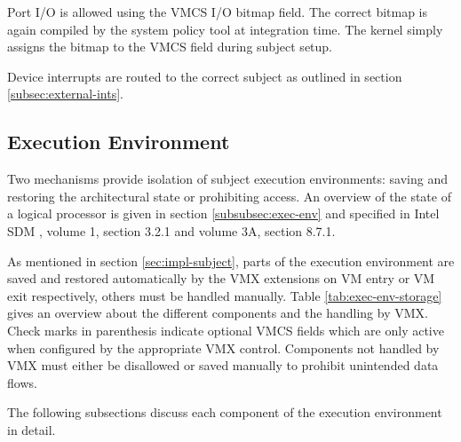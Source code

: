 Port I/O is allowed using the VMCS I/O bitmap field. The correct bitmap is again
compiled by the system policy tool at integration time. The kernel simply assigns
the bitmap to the VMCS field during subject setup.

Device interrupts are routed to the correct subject as outlined in section
\ref{subsec:external-ints}.

\subsection{Execution Environment}\label{subsec:exec-env-sep}
Two mechanisms provide isolation of subject execution environments: saving and
restoring the architectural state or prohibiting access. An overview of the
state of a logical processor is given in section \ref{subsubsec:exec-env} and
specified in Intel SDM \cite{IntelSDM}, volume 1, section 3.2.1 and volume 3A,
section 8.7.1.

As mentioned in section \ref{sec:impl-subject}, parts of the execution
environment are saved and restored automatically by the VMX extensions on VM
entry or VM exit respectively, others must be handled manually. Table
\ref{tab:exec-env-storage} gives an overview about the different components and
the handling by VMX. Check marks in parenthesis indicate optional VMCS fields
which are only active when configured by the appropriate VMX control.
Components not handled by VMX must either be disallowed or saved manually to
prohibit unintended data flows.

The following subsections discuss each component of the execution environment in
detail.

